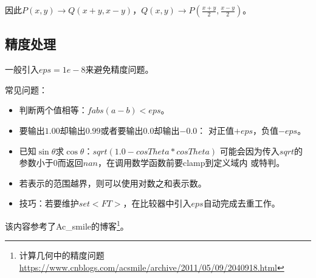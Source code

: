 因此$P(x,y)\rightarrow Q(x+y,x-y)$，$Q(x,y)
\rightarrow P(\frac{x+y}{2},\frac{x-y}{2})$。
\subsection{精度处理}
一般引入$eps=1e-8$来避免精度问题。

常见问题：
\begin{itemize}
    \item 判断两个值相等：$fabs(a-b)<eps$。
    \item 要输出$1.00$却输出$0.99$或者要输出$0.0$却输出$-0.0$：
        对正值$+eps$，负值$-eps$。
    \item 已知$\sin \theta$求$\cos \theta$：$sqrt(1.0-cosTheta*cosTheta)$
    可能会因为传入$sqrt$的参数小于0而返回$nan$，在调用数学函数前要clamp到定义域内
    或特判。
    \item 若表示的范围越界，则可以使用对数之和表示数。
    \item 技巧：若要维护$set<FT>$，在比较器中引入$eps$自动完成去重工作。
\end{itemize}
该内容参考了Ac\_smile的博客\footnote{计算几何中的精度问题\\
    \url{https://www.cnblogs.com/acsmile/archive/2011/05/09/2040918.html}
}。

